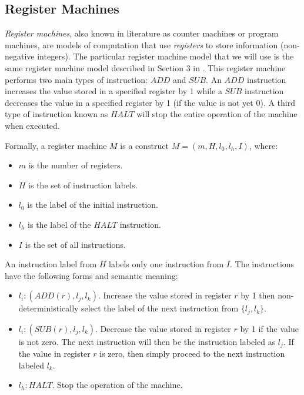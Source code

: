 \documentclass[smallextended]{svjour3}
\begin{document}
\subsection{Register Machines}\label{sec-register}

\textit{Register machines}, also known in literature as counter machines or program machines, are models of computation that use \textit{registers} to
store information (non-negative integers). The particular register machine model that we will use is the same register machine model described in 
Section 3 in \cite{ionescu-2006-snp}. This register machine performs two main types of instruction: $ADD$ and $SUB$. An $ADD$ instruction increases the value 
stored in a specified register by 1 while a $SUB$ instruction decreases the value in a specified register by 1 (if the value is not yet 0). A third 
type of  instruction known as $HALT$ will stop the entire operation of the machine when executed.
    
Formally, a register machine $M$ is a construct $M = (m, H, l_0, l_h, I)$, where:
  
\begin{itemize}  
   \item $m$ is the number of registers.    
   \item $H$ is the set of instruction labels.    
   \item $l_0$ is the label of the initial instruction.
   \item $l_h$ is the label of the $HALT$ instruction.
   \item $I$ is the set of all instructions.    
\end{itemize}

An instruction label from $H$ labels only one instruction from $I$. The instructions have the following forms and semantic meaning:

\begin{itemize}
   \item $l_i: (ADD(r),l_j,l_k)$. Increase the value stored in register $r$ by 1 then non-deterministically select the label of the next instruction
         from $\{l_j,l_k\}$.         
   \item $l_i: (SUB(r),l_j,l_k)$. Decrease the value stored in register $r$ by 1 if the value is not zero. The next instruction will then be the 
         instruction labeled as $l_j$. If the value in register $r$ is zero, then simply proceed to the next instruction labeled $l_k$.
   \item $l_h: HALT$. Stop the operation of the machine.
\end{itemize}
  
\end{document}
